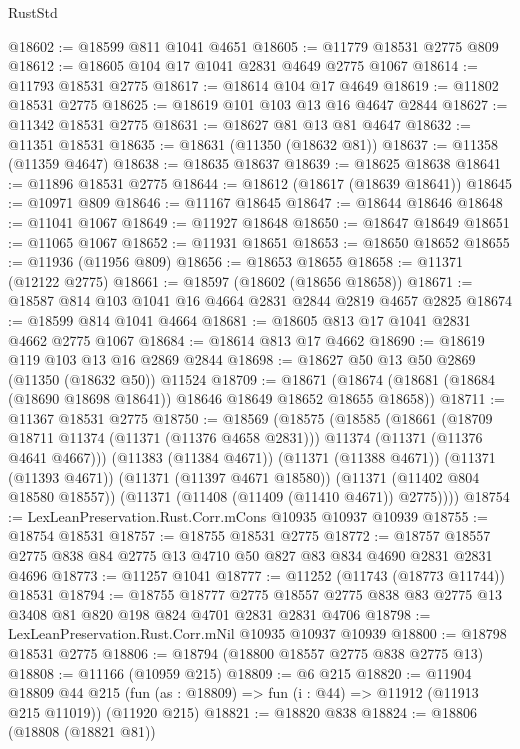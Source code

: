 \begin{lexlean}{RustStd}
\begin{coremodule}
{\begin{coremodule}
{{{{{{{{{{{{{{{{{{{{{{{{{{{{{{{{{@18602 := @18599 @811 @1041 @4651
@18605 := @11779 @18531 @2775 @809
@18612 := @18605 @104 @17 @1041 @2831 @4649 @2775 @1067
@18614 := @11793 @18531 @2775
@18617 := @18614 @104 @17 @4649
@18619 := @11802 @18531 @2775
@18625 := @18619 @101 @103 @13 @16 @4647 @2844
@18627 := @11342 @18531 @2775
@18631 := @18627 @81 @13 @81 @4647
@18632 := @11351 @18531
@18635 := @18631 (@11350 (@18632 @81))
@18637 := @11358 (@11359 @4647)
@18638 := @18635 @18637
@18639 := @18625 @18638
@18641 := @11896 @18531 @2775
@18644 := @18612 (@18617 (@18639 @18641))
@18645 := @10971 @809
@18646 := @11167 @18645
@18647 := @18644 @18646
@18648 := @11041 @1067
@18649 := @11927 @18648
@18650 := @18647 @18649
@18651 := @11065 @1067
@18652 := @11931 @18651
@18653 := @18650 @18652
@18655 := @11936 (@11956 @809)
@18656 := @18653 @18655
@18658 := @11371 (@12122 @2775)
@18661 := @18597 (@18602 (@18656 @18658))
@18671 := @18587 @814 @103 @1041 @16 @4664 @2831 @2844 @2819 @4657 @2825
@18674 := @18599 @814 @1041 @4664
@18681 := @18605 @813 @17 @1041 @2831 @4662 @2775 @1067
@18684 := @18614 @813 @17 @4662
@18690 := @18619 @119 @103 @13 @16 @2869 @2844
@18698 := @18627 @50 @13 @50 @2869 (@11350 (@18632 @50)) @11524
@18709 := @18671
    (@18674 (@18681 (@18684 (@18690 @18698 @18641)) @18646 @18649 @18652 @18655 @18658))
@18711 := @11367 @18531 @2775
@18750 := @18569
    (@18575
      (@18585
        (@18661
          (@18709 @18711 @11374 (@11371 (@11376 @4658 @2831)))
          @11374
          (@11371 (@11376 @4641 @4667)))
        (@11383 (@11384 @4671))
        (@11371 (@11388 @4671))
        (@11371 (@11393 @4671))
        (@11371 (@11397 @4671 @18580))
        (@11371 (@11402 @804 @18580 @18557))
        (@11371 (@11408 (@11409 (@11410 @4671)) @2775))))
@18754 := LexLeanPreservation.Rust.Corr.mCons @10935 @10937 @10939
@18755 := @18754 @18531
@18757 := @18755 @18531 @2775
@18772 := @18757 @18557 @2775 @838 @84 @2775 @13 @4710 @50 @827 @83 @834 @4690 @2831 @2831 @4696
@18773 := @11257 @1041
@18777 := @11252 (@11743 (@18773 @11744)) @18531
@18794 := @18755
    @18777
    @2775
    @18557
    @2775
    @838
    @83
    @2775
    @13
    @3408
    @81
    @820
    @198
    @824
    @4701
    @2831
    @2831
    @4706
@18798 := LexLeanPreservation.Rust.Corr.mNil @10935 @10937 @10939
@18800 := @18798 @18531 @2775
@18806 := @18794 (@18800 @18557 @2775 @838 @2775 @13)
@18808 := @11166 (@10959 @215)
@18809 := @6 @215
@18820 := @11904
    @18809
    @44
    @215
    (fun (as : @18809) => fun (i : @44) => @11912 (@11913 @215 @11019))
    (@11920 @215)
@18821 := @18820 @838
@18824 := @18806 (@18808 (@18821 @81))
}}}}}}}}}}}}}}}}}}}}}}}}}}}}}}}}}
\end{coremodule}}
\end{coremodule}
\end{lexlean}
